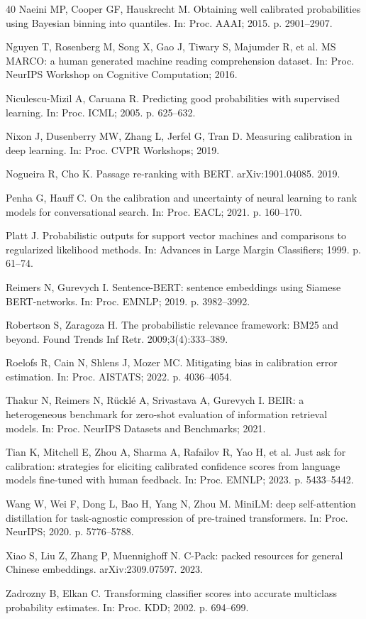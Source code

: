 \documentclass[sn-mathphys-num,pdflatex]{sn-jnl}
\begin{document}
\begin{thebibliography}{40}
 Naeini MP, Cooper GF, Hauskrecht M. Obtaining well
calibrated probabilities using Bayesian binning into quantiles. In: Proc. AAAI;
2015. p. 2901--2907.

 Nguyen T, Rosenberg M, Song X, Gao J, Tiwary S,
Majumder R, et al. MS MARCO: a human generated machine reading comprehension
dataset. In: Proc. NeurIPS Workshop on Cognitive Computation; 2016.

 Niculescu-Mizil A, Caruana R. Predicting good
probabilities with supervised learning. In: Proc. ICML; 2005. p. 625--632.

 Nixon J, Dusenberry MW, Zhang L, Jerfel G, Tran D. Measuring
calibration in deep learning. In: Proc. CVPR Workshops; 2019.

 Nogueira R, Cho K. Passage re-ranking with BERT.
arXiv:1901.04085. 2019.

 Penha G, Hauff C. On the calibration and uncertainty of
neural learning to rank models for conversational search. In: Proc. EACL; 2021.
p. 160--170.

 Platt J. Probabilistic outputs for support vector machines
and comparisons to regularized likelihood methods. In: Advances in Large Margin
Classifiers; 1999. p. 61--74.

 Reimers N, Gurevych I. Sentence-BERT: sentence
embeddings using Siamese BERT-networks. In: Proc. EMNLP; 2019. p. 3982--3992.

 Robertson S, Zaragoza H. The probabilistic relevance
framework: BM25 and beyond. Found Trends Inf Retr. 2009;3(4):333--389.

 Roelofs R, Cain N, Shlens J, Mozer MC. Mitigating bias in
calibration error estimation. In: Proc. AISTATS; 2022. p. 4036--4054.

 Thakur N, Reimers N, R\"uckl\'e A, Srivastava A,
Gurevych I. BEIR: a heterogeneous benchmark for zero-shot evaluation of
information retrieval models. In: Proc. NeurIPS Datasets and Benchmarks; 2021.

 Tian K, Mitchell E, Zhou A, Sharma A, Rafailov R, Yao H, et al.
Just ask for calibration: strategies for eliciting calibrated confidence scores
from language models fine-tuned with human feedback. In: Proc. EMNLP; 2023. p.
5433--5442.

 Wang W, Wei F, Dong L, Bao H, Yang N, Zhou M. MiniLM:
deep self-attention distillation for task-agnostic compression of pre-trained
transformers. In: Proc. NeurIPS; 2020. p. 5776--5788.

 Xiao S, Liu Z, Zhang P, Muennighoff N. C-Pack: packed
resources for general Chinese embeddings. arXiv:2309.07597. 2023.

 Zadrozny B, Elkan C. Transforming classifier scores into
accurate multiclass probability estimates. In: Proc. KDD; 2002. p. 694--699.

\end{thebibliography}
\fi
\end{document}
